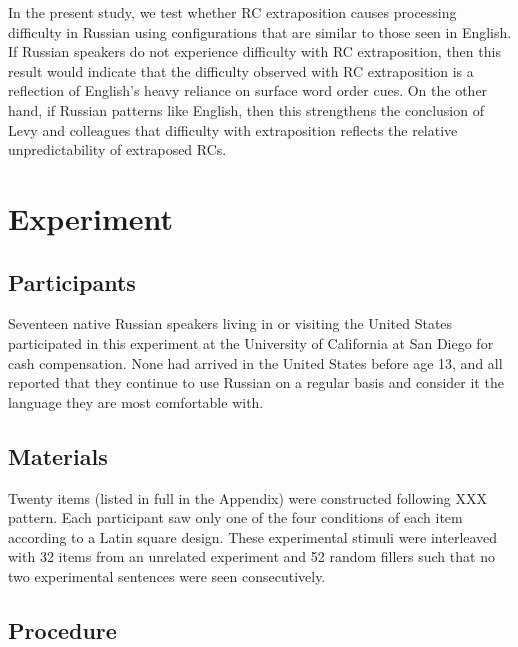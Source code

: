 \documentclass[12pt]{article}
\begin{document}
	 In the present study, we test whether RC extraposition causes processing difficulty in Russian using configurations that are similar to those seen in English. If Russian speakers do not experience difficulty with RC extraposition, then this result would indicate that the difficulty observed with RC extraposition is a reflection of English's heavy reliance on surface word order cues. On the other hand, if Russian patterns like English, then this strengthens the conclusion of Levy and colleagues that difficulty with extraposition reflects the relative unpredictability of extraposed RCs. 
	  



\section{Experiment}
\label{sec:experiment}

\subsection{Participants}
\label{sec:participants}

Seventeen native Russian speakers living in or visiting the United
States participated in this experiment at the University of California
at San Diego for cash compensation.  None had arrived in the United
States before age 13, and all reported that they continue to use
Russian on a regular basis and consider it the language they are most
comfortable with.

\subsection{Materials}
\label{sec:materials}


Twenty items (listed in full in the Appendix) were constructed following XXX
pattern.  Each participant saw only one of the four conditions of each
item according to a Latin square design.  These experimental stimuli
were interleaved with 32 items from an unrelated experiment and 52
random fillers such that no two experimental sentences were seen
consecutively.



\subsection{Procedure}
\label{sec:procedure}
\end{document}
